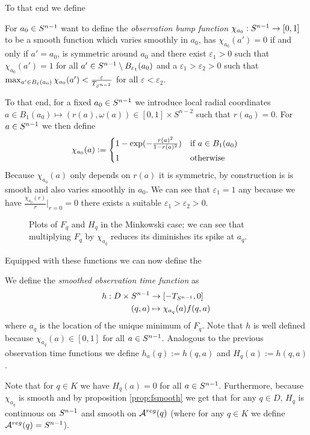 To that end we define 
\begin{definition}\label{def:obsbumpfn}
    For $a_0\in {S^{n-1}}$ want to define the \emph{observation bump function} $\chi_{a_0}:{S^{n-1}}\to [0,1]$ to be a smooth function which varies smoothly in $a_0$, has $\chi_{a_0}(a')=0$ if and only if $a'=a_0$, is symmetric around $a_0$ and there exist $\varepsilon_1>0$ such that $\chi_{a_0}(a')=1$ for all $a'\in {S^{n-1}}\setminus B_{\varepsilon_1}(a_0)$ and a $\varepsilon_1 > \varepsilon_2 > 0$ such that $\max_{a'\in B_{\varepsilon}(a_0)} \chi_{a_0}(a')<\frac{\varepsilon}{T_{S^{n-1}}}$ for all $\varepsilon<\varepsilon_2$.

    To that end, for a fixed $a_0\in {S^{n-1}}$ we introduce local radial coordinates $a\in B_1(a_0)\mapsto (r(a),\omega(a))\in [0,1]\times S^{n-2}$ such that $r(a_0)=0$. For $a \in {S^{n-1}}$ we then define 
    \begin{equation*}
        \chi_{a_0}(a) := 
        \begin{cases*}
            1-\exp(-\frac{r(a)^2}{1-r(a)^2}) & if $a\in B_1(a_0)$ \\
            1 & otherwise
        \end{cases*}
    \end{equation*}
    Because $\chi_{a_0}(a)$ only depends on $r(a)$ it is symmetric, by construction is is smooth and also varies smoothly in $a_0$. We can see that $\varepsilon_1 = 1$ any because we have $\frac{\chi_{a_0}(r)}{r}\rvert_{r=0}=0$ there exists a suitable $\varepsilon_1 > \varepsilon_2 > 0$.
\end{definition}

\begin{figure}\label{fig:SmoothedObsTime}
    \centering
    
    \caption{
        Plots of $F_q$ and $H_q$ in the Minkowski case; we can see that multiplying $F_q$ by $\chi_{a_q}$ reduces its diminishes its spike at $a_q$.
    }
\end{figure}

Equipped with these functions we can now define the
\begin{definition}
    We define the \emph{smoothed observation time function} as 
    \begin{align*}
        h:D\times {S^{n-1}} &\to [-T_{S^{n-1}},0] \\
        (q,a)&\mapsto \chi_{a_q}(a)f(q,a)
    \end{align*}
    where $a_q$ is the location of the unique minimum of $F_q$. Note that $h$ is well defined because $\chi_{a_q}(a)\in [0,1]$ for all $a\in {S^{n-1}}$. 
    Analogous to the previous observation time functions we define $h_a(q):=h(q,a)$ and $H_q(a):=h(q,a)$.
\end{definition}
\begin{remark}
    Note that for $q\in K$ we have $H_q(a)=0$ for all $a\in {S^{n-1}}$. Furthermore, because $\chi_{a_q}$ is smooth and by proposition \ref{prop:fsmooth} we get that for any $q\in D$, $H_q$ is continuous on ${S^{n-1}}$ and smooth on ${{\mathcal{A}}^{reg}}(q)$ (where for any $q\in K$ we define ${{\mathcal{A}}^{reg}}(q)={S^{n-1}}$).
\end{remark}

